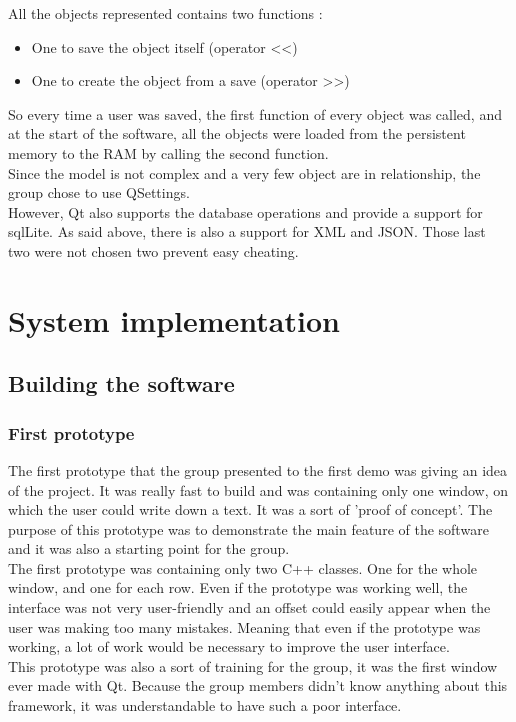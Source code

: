 All the objects represented contains two functions :
\begin{itemize}
	\item One to save the object itself (operator <<)
	\item One to create the object from a save (operator >>)
\end{itemize}

So every time a user was saved, the first function of every object was called, and at the start of the software, all the objects were loaded from the persistent memory to the RAM by calling the second function.\\
Since the model is not complex and a very few object are in relationship, the group chose to use QSettings. \\
However, Qt also supports the database operations and provide a support for sqlLite. As said above, there is also a support for XML and JSON. Those last two were not chosen two prevent easy cheating.


\part{System implementation}

\chapter{Building the software}
\section{First prototype}
The first prototype that the group presented to the first demo was giving an idea of the project. It was really fast to build and was containing only one window, on which the user could write down a text. It was a sort of 'proof of concept'. The purpose of this prototype was to demonstrate the main feature of the software and it was also a starting point for the group.\\
The first prototype was containing only two C++ classes. One for the whole window, and one for each row. Even if the prototype was working well, the interface was not very user-friendly and an offset could easily appear when the user was making too many mistakes.
Meaning that even if the prototype was working, a lot of work would be necessary to improve the user interface. \\
This prototype was also a sort of training for the group, it was the first window ever made with Qt. Because the group members didn't know anything about this framework, it was understandable to have such a poor interface.

